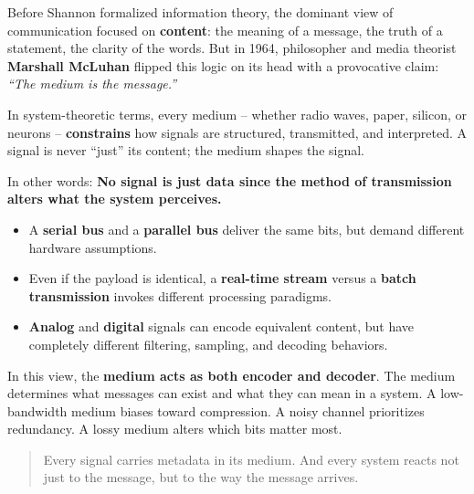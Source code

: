 \begin{tcolorbox}[title={\textbf{Historical Sidebar: The Medium as Encoder and Decoder}}, colback=gray!5, colframe=black, fonttitle=\bfseries]

  Before Shannon formalized information theory, the dominant view of communication focused on \textbf{content}: the meaning of a message, the truth of a statement, the clarity of the words. But in 1964, philosopher and media theorist \textbf{Marshall McLuhan} flipped this logic on its head with a provocative claim: \textit{“The medium is the message.”}
  
  \medskip
  
  In system-theoretic terms, every medium -- whether radio waves, paper, silicon, or neurons -- \textbf{constrains} how signals are structured, transmitted, and interpreted. A signal is never “just” its content; the medium shapes the signal.

  \medskip

  In other words: \textbf{No signal is just data since the method of transmission alters what the system perceives.}

  \medskip
  
  \begin{itemize}

    \item A \textbf{serial bus} and a \textbf{parallel bus} deliver the same bits, but demand different hardware assumptions.
    \item Even if the payload is identical, a \textbf{real-time stream} versus a \textbf{batch transmission} invokes different processing paradigms.
    \item \textbf{Analog} and \textbf{digital} signals can encode equivalent content, but have completely different filtering, sampling, and decoding behaviors.
  \end{itemize}
  
  \medskip
  
  In this view, the \textbf{medium acts as both encoder and decoder}. The medium determines what messages can exist and what they can mean in a system. A low-bandwidth medium biases toward compression. A noisy channel prioritizes redundancy. A lossy medium alters which bits matter most.
  
  \begin{quote}
  Every signal carries metadata in its medium. And every system reacts not just to the message, but to the way the message arrives.
  \end{quote}
  
\end{tcolorbox}

